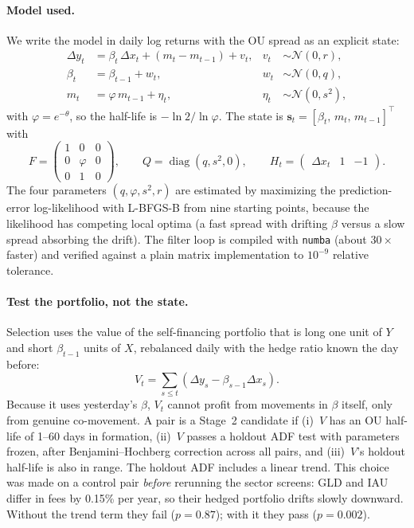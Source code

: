 \documentclass[11pt]{article}
\newcommand{\code}[1]{\texttt{#1}}
\begin{document}
\paragraph{Model used.} We write the model in daily log returns with the OU spread as an
explicit state:
\begin{align}
  \Delta y_t &= \beta_t\,\Delta x_t + (m_t - m_{t-1}) + v_t, & v_t &\sim \mathcal N(0,r),\\
  \beta_t &= \beta_{t-1} + w_t, & w_t &\sim \mathcal N(0,q),\\
  m_t &= \varphi\, m_{t-1} + \eta_t, & \eta_t &\sim \mathcal N(0,s^2),
\end{align}
with $\varphi=e^{-\theta}$, so the half-life is $-\ln 2/\ln\varphi$. The state is
$\mathbf s_t=[\beta_t,\,m_t,\,m_{t-1}]^\top$ with
\begin{equation}
  F=\begin{pmatrix}1&0&0\\0&\varphi&0\\0&1&0\end{pmatrix},\qquad
  Q=\operatorname{diag}(q,s^2,0),\qquad
  H_t=\begin{pmatrix}\Delta x_t & 1 & -1\end{pmatrix}.
\end{equation}
The four parameters $(q,\varphi,s^2,r)$ are estimated by maximizing the prediction-error
log-likelihood with L-BFGS-B from nine starting points, because the likelihood has competing
local optima (a fast spread with drifting $\beta$ versus a slow spread absorbing the drift).
The filter loop is compiled with \code{numba} (about $30\times$ faster) and verified against
a plain matrix implementation to $10^{-9}$ relative tolerance.

\paragraph{Test the portfolio, not the state.} Selection uses the value of the self-financing
portfolio that is long one unit of $Y$ and short $\beta_{t-1}$ units of $X$, rebalanced daily
with the hedge ratio known the day before:
\begin{equation}
  V_t=\sum_{s\le t}\left(\Delta y_s-\beta_{s-1}\Delta x_s\right).
\end{equation}
Because it uses yesterday's $\beta$, $V_t$ cannot profit from movements in $\beta$ itself, only
from genuine co-movement. A pair is a Stage~2 candidate if (i)~$V$ has an OU half-life of
1--60 days in formation, (ii)~$V$ passes a holdout ADF test with parameters frozen, after
Benjamini--Hochberg correction across all pairs, and (iii)~$V$'s holdout half-life is also in
range. The holdout ADF includes a linear trend. This choice was made on a control pair
\emph{before} rerunning the sector screens: GLD and IAU differ in fees by 0.15\% per year,
so their hedged portfolio drifts slowly downward. Without the trend term they fail
($p=0.87$); with it they pass ($p=0.002$).
\end{document}
